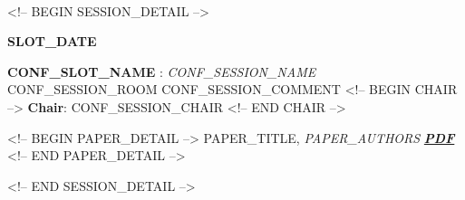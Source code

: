 

\hypertarget{conf-program}{~}

<!-- BEGIN SESSION_DETAIL -->

\centerline{\Large \bf {SLOT_DATE}}

\bigskip

\noindent
\textbf{{CONF_SLOT_NAME}} : 
           \textit{{CONF_SESSION_NAME}}  
             {CONF_SESSION_ROOM}
            {CONF_SESSION_COMMENT}
<!-- BEGIN CHAIR -->
 \textbf{Chair}: {CONF_SESSION_CHAIR}
<!-- END CHAIR -->
\smallskip

<!-- BEGIN PAPER_DETAIL -->
\noindent
{{PAPER_TITLE}}, \newline
\textit{{PAPER_AUTHORS}} \hfill 
\textbf{\textit{ \href{PDF/p{PAPER_ID}.pdf}{PDF}}} 
\newline
<!-- END PAPER_DETAIL -->

<!-- END SESSION_DETAIL -->

